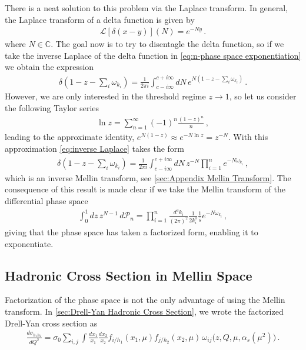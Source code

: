 There is a neat solution to this problem via the Laplace transform. In general, the Laplace transform of a delta function is given by
\begin{align}
    \mathcal{L}[\delta(x-y)](N)=e^{-Ny}\,.
\end{align}
where $N\in\mathbb{C}$. The goal now is to try to disentagle the delta function, so if we take the inverse Laplace of the delta function in \cref{eq:n-phase space exponentiation} we obtain the expression
\begin{align}\label{eq:inverse Laplace}
    \delta(1-z-\sum_i \omega_{k_i})=\frac{1}{2\pi i}\int_{c-i\infty}^{c+i\infty}dN\, e^{N(1-z-\sum_i \omega_{k_i})}\,.
\end{align}
However, we are only interested in the threshold regime $z\rightarrow 1$, so let us consider the following Taylor series
\begin{align}
    \ln z=\sum_{n=1}^{\infty}(-1)^{n}\frac{(1-z)^{n}}{n}\,,
\end{align}
leading to the approximate identity, $e^{N(1-z)}\approx e^{-N\ln z}=z^{-N}$. With this approximation \cref{eq:inverse Laplace} takes the form
\begin{align}
    \delta(1-z-\sum_i \omega_{k_i})=\frac{1}{2\pi i}\int_{c-i\infty}^{c+i\infty}dN\, z^{-N}\prod_{i=1}^{n}e^{-N\omega_{k_i}}\,,
\end{align}
which is an inverse Mellin transform, see \cref{sec:Appendix Mellin Transform}. The consequence of this result is made clear if we take the Mellin transform of the differential phase space
\begin{align}
    \int_{0}^{1}dz\,z^{N-1}\,d\mathcal{P}_{n}=\prod_{i=1}^{n}\frac{d^{3}k_{i}}{(2\pi)^{2}}\frac{1}{2k_{i}^{0}}\frac{1}{\hat{s}}e^{-N\omega_{k_i}}\,,
\end{align}
giving that the phase space has taken a factorized form, enabling it to exponentiate.

\subsection{Hadronic Cross Section in Mellin Space}
Factorization of the phase space is not the only advantage of using the Mellin transform. In \cref{sec:Drell-Yan Hadronic Cross Section}, we wrote the factorized Drell-Yan cross section as
\begin{align}\label{eq:Factorized Dre-Yan Cross Section}
   \frac{ d\sigma_{h_1h_2}}{dQ^{2}}=\sigma_{0}\sum_{i,j}\int \frac{dx_{1}}{x_1}\frac{dx_{2}}{x_2}f_{i/h_1}(x_1,\mu)f_{j/h_2}(x_2,\mu)\,\omega_{ij}\Big(z,Q,\mu,\alpha_s(\mu^{2})\Big)\,.
\end{align}

